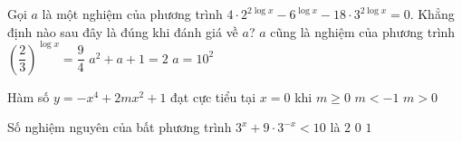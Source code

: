 \begin{ex}%
	Gọi $a$ là một nghiệm của phương trình $4\cdot 2^{2\log x}-6^{\log x}-18\cdot 3^{2\log x}=0$. Khẳng định nào sau đây là đúng khi đánh giá về $a$?
	{\True $a$ cũng là nghiệm của phương trình $\left (\dfrac{2}{3}\right )^{\log x}=\dfrac{9}{4}$}
	{$a^2+a+1=2$}
	{$a=10^2$}
\end{ex}

\begin{ex}%
	Hàm số $y=-x^4+2mx^2+1$ đạt cực tiểu tại $x=0$ khi
	{$m\ge 0$}
	{$m<-1$}
	{\True $m>0$}
\end{ex}

\begin{ex}%
	Số nghiệm nguyên của bất phương trình $3^x+9\cdot 3^{-x} <10$ là
	{$2$}
	{$0$}
	{\True $1$}
	
\end{ex}

